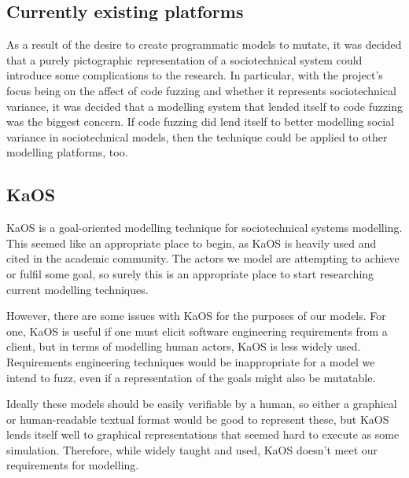 \subsection{Currently existing platforms}
As a result of the desire to create programmatic models to mutate, it was decided that a purely pictographic representation of a sociotechnical system could introduce some complications to the research. In particular, with the project's focus being on the affect of code fuzzing and whether it represents sociotechnical variance, it was decided that a modelling system that lended itself to code fuzzing was the biggest concern. If code fuzzing did lend itself to better modelling social variance in sociotechnical models, then the technique could be applied to other modelling platforms, too. \par

\subsection{KaOS} %
KaOS is a goal-oriented modelling technique for sociotechnical systems modelling\cite{Werneck2009}. This seemed like an appropriate place to begin, as KaOS is heavily used and cited in the academic community. The actors we model are attempting to achieve or fulfil some goal, so surely this is an appropriate place to start researching current modelling techniques.\par%
However, there are some issues with KaOS for the purposes of our models. For one, KaOS is useful if one must elicit software engineering requirements from a client, but in terms of modelling human actors, KaOS is less widely used. Requirements engineering techniques would be inappropriate for a model we intend to fuzz, even if a representation of the goals might also be mutatable. \par 
Ideally these models should be easily verifiable by a human, so either a graphical or human-readable textual format would be good to represent these, but KaOS lends itself well to graphical representations that seemed hard to execute as some simulation. Therefore, while widely taught and used, KaOS doesn't meet our requirements for modelling. \par


